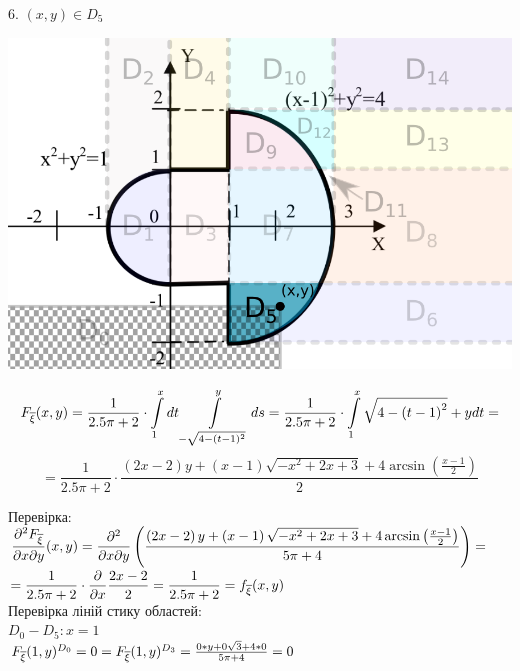 \documentclass[14pt,a4paper]{scrartcl}
\theoremstyle{definition}
\theoremstyle{remark}
\theoremstyle{definition}
\theoremstyle{definition}
\begin{document}
6. $(x,y) \in D_5$
\begin{center} \includegraphics[scale=0.4]{assets/zone54.png} \end{center}
$$
F_{\overline{\xi}} (x,y) = \frac{1}{2.5\pi + 2} \cdot \int\limits_{1}^{x}{dt  \int\limits_{-\sqrt{4 - (t-1)^2}}^{ y}{ds}}   = \frac{1}{2.5\pi + 2} \cdot  \int\limits_{1}^{x}{\sqrt{4-\left(t-1\right)^2}+y dt}  =
$$
$$
=\frac{1}{2.5\pi + 2} \cdot \dfrac{\left(2x-2\right)y+\left(x-1\right)\sqrt{-x^2+2x+3}+4\arcsin\left(\frac{x-1}{2}\right)}{2}
$$

Перевірка:\\
$\dfrac{\partial^2 F_{\overline{\xi}}}{\partial x \partial y}(x,y) =
\dfrac{\partial^2}{\partial x \partial y} \left( \dfrac{\left(2x-2\right)y+\left(x-1\right)\sqrt{-x^2+2x+3}+4\arcsin\left(\frac{x-1}{2}\right)}{5\pi + 4}\right) = $\\$=\dfrac{1}{2.5\pi + 2} \cdot  \dfrac{\partial}{\partial x} \dfrac{2x-2}{2} = \dfrac{1}{2.5\pi + 2}  =f_{\overline{\xi}} (x,y)$\\

Перевірка ліній стику областей:\\
$D_0 - D_5: x = 1$\\
$ F_{\overline{\xi}} (1,y)^{D_0} = 0 =  F_{\overline{\xi}} (1,y)^{D_3} = \frac{0*y + 0\sqrt{3} + 4* 0}{5\pi + 4} =  0$\\
\newpage
\end{document}

